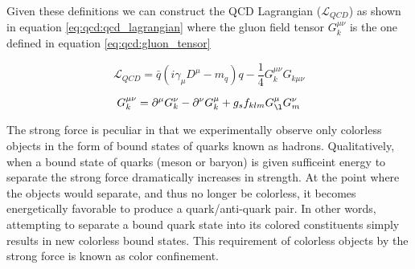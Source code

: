 Given these definitions we can construct the QCD Lagrangian
($\mathcal{L}_{QCD}$) as shown in equation \ref{eq:qcd:qcd_lagrangian} where the
gluon field tensor $G_{k}^{\mu\nu}$ is the one defined in equation
\ref{eq:qcd:gluon_tensor}

\begin{equation} \label{eq:qcd:qcd_lagrangian}
\mathcal{L}_{QCD} = \bar{q}(i\gamma_{\mu}D^{\mu} - m_{q})q -
\frac{1}{4}G_{k}^{\mu\nu}G_{k\mu\nu}
\end{equation}

\begin{equation} \label{eq:qcd:gluon_tensor}
G_{k}^{\mu\nu} = \partial^{\mu}G_{k}^{\nu} - \partial^{\nu}G_{k}^{\mu} +
g_{s}f_{klm}G_{\l}^{\mu}G_{m}^{\nu}
\end{equation}

The strong force is peculiar in that we experimentally observe only colorless
objects in the form of bound states of quarks known as hadrons.  Qualitatively,
when a bound state of quarks (meson or baryon) is given sufficeint energy to
separate the strong force dramatically increases in strength.  At the point
where the objects would separate, and thus no longer be colorless, it becomes
energetically favorable to produce a quark/anti-quark pair.  In other words,
attempting to separate a bound quark state into its colored constituents simply
results in new colorless bound states.  This requirement of colorless objects by
the strong force is known as color confinement. 

